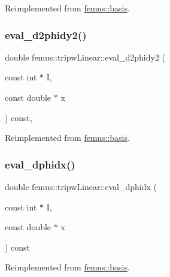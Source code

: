 Reimplemented from \mbox{\hyperlink{classfemus_1_1basis_ac9feaf9e60421143db2a3708f3c7fa48}{femus\+::basis}}.

\mbox{\label{classfemus_1_1tripw_linear_a7e8c27384a8008358e7d85ac0c7b3c5e}} 
\subsubsection{\texorpdfstring{eval\+\_\+d2phidy2()}{eval\_d2phidy2()}}
{\footnotesize\ttfamily double femus\+::tripw\+Linear\+::eval\+\_\+d2phidy2 (\begin{DoxyParamCaption}\item[{const int $\ast$}]{I,  }\item[{const double $\ast$}]{x }\end{DoxyParamCaption}) const\hspace{0.3cm}{\ttfamily [inline]}, {\ttfamily [virtual]}}



Reimplemented from \mbox{\hyperlink{classfemus_1_1basis_a0febb29fe4b32213ff8d6d428f7241cd}{femus\+::basis}}.

\mbox{\label{classfemus_1_1tripw_linear_afc6135a1c5ae6ef1567610e0d764de3d}} 
\subsubsection{\texorpdfstring{eval\+\_\+dphidx()}{eval\_dphidx()}}
{\footnotesize\ttfamily double femus\+::tripw\+Linear\+::eval\+\_\+dphidx (\begin{DoxyParamCaption}\item[{const int $\ast$}]{I,  }\item[{const double $\ast$}]{x }\end{DoxyParamCaption}) const\hspace{0.3cm}{\ttfamily [virtual]}}



Reimplemented from \mbox{\hyperlink{classfemus_1_1basis_a4db7d29cf8a753ddbccc4a297dafa0bf}{femus\+::basis}}.

